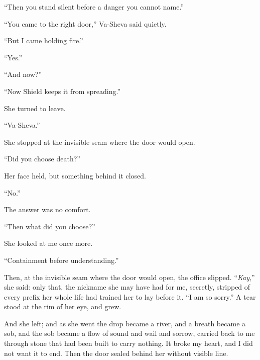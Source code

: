 ``Then you stand silent before a danger you cannot name.''\par

``You came to the right door,'' Va-Sheva said quietly.\par

``But I came holding fire.''\par

``Yes.''\par

``And now?''\par

``Now Shield keeps it from spreading.''\par

She turned to leave.\par

``Va-Sheva.''\par

She stopped at the invisible seam where the door would open.\par

``Did you choose death?''\par

Her face held, but something behind it closed.\par

``No.''\par

The answer was no comfort.\par

``Then what did you choose?''\par

She looked at me once more.\par

``Containment before understanding.''\par

Then, at the invisible seam where the door would open, the office slipped. ``\textit{Kay},'' she said: only that, the nickname she may have had for me, secretly, stripped of every prefix her whole life had trained her to lay before it. ``I am so sorry.'' A tear stood at the rim of her eye, and grew.\par

And she left; and as she went the drop became a river, and a breath became a sob, and the sob became a flow of sound and wail and sorrow, carried back to me through stone that had been built to carry nothing. It broke my heart, and I did not want it to end. Then the door sealed behind her without visible line.\par

